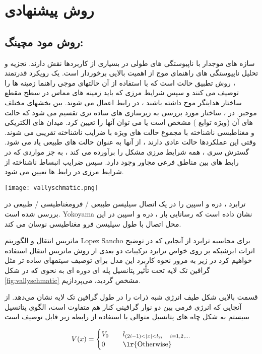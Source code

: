 \chapter{روش پیشنهادی}
\clearpage

\section{روش مود مچینگ:}
سازه های موجدار با ناپیوستگی های طولی در بسیاری از کاربردها نقش دارند. تجزیه و تحلیل ناپیوستگی های راهنمای موج از اهمیت بالایی برخوردار است. یک رویکرد قدرتمند ، روش تطبیق حالت  است که با استفاده از آن حالتهای موجی راهنما زمینه ها را توصیف می کنند و سپس شرایط مرزی که باید زمینه های مماس در سطح مقطع ساختار هدایتگر موج داشته باشند ، در رابط اعمال می شوند. بین بخشهای مختلف موجبر. در  ، ساختار مورد بررسی به زیرسازی های ساده تری تقسیم می شود که حالت های آن (ویژه توابع ) مشخص است یا می توان آنها را تعیین کرد. میدان های الکتریکی و مغناطیسی ناشناخته با مجموع حالت های ویژه با ضرایب ناشناخته تقریبی می شوند. وقتی این عملکردها حالت عادی دارند ، از آنها به عنوان حالت های طبیعی یاد می شود. گسترش سری ، همه شرایط مرزی مشکل را برآورده می کند ، به جز مواردی که در رابط های بین مناطق فرعی مجاور وجود دارد. سپس ضرایب انبساط ناشناخته از شرایط مرزی در رابط ها تعیین می شود.
\begin{figure*}
    \centering
    \texttt{[image: vallyschmatic.png]}
    \caption{اتصال سیلیسین معمولی / فرومغناطیسی / معمولی}
    \label{fig:vallyschmatic}
\end{figure*}
ترابرد ، دره و اسپین را در یک اتصال سیلیسن طبیعی / فرومغناطیسی / طبیعی در \cite{yokoyamaControllableValleySpin2013} بررسی شده است. \gls{Yokoyama} نشان داده است که رسانایی بار ، دره و اسپین در این محل اتصال با طول سیلیسن فرو مغناطیسی نوسان می کند.

ماتریس انتقال و الگوریتم \gls{Lopez Sancho} برای محاسبه ترابرد
از آنجایی که در توضیح اثرات ابرشبکه بر روی خواص ترابرد ترکیبات دو بعدی از روش ماتریس انتقال استفاده خواهیم کرد در زیر به مرور نحوه کاربرد این مدل برای توصیف سیتمهای ساده تر مثل گرافین تک لایه تحت تأثیر پتانسیل پله ای دوره ای به نحوی که در شکل \ref{fig:vallyschmatic} مشخص گردید، می‌پردازیم.

قسمت بالایی شکل طیف انرژی شبه ذرات را در طول گرافین تک لایه نشان می‌دهد. از آنجایی که انرژی فرمی بین دو نوار گرافینی کنار هم متفاوت است، الگوی پتانسیل سیستم به شکل چاه های پتانسیل متوالی با استفاده از رابطه زیر قابل توصیف است

\begin{equation}
	V(x) = \begin{cases}
    V_0 &\quad l_{(2i-1)< |x| < l_{2i}\quad i=1,2,\dots}\\
    0 &\quad\text{\lr{Otherwise}}
\end{cases}
\end{equation}

